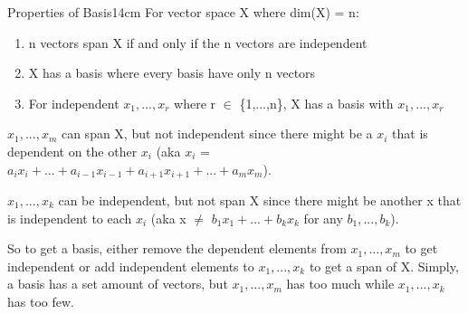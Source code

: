     \vspace{0.5cm}



    \begin{wtheorem}{Properties of Basis}{14cm}
        For vector space X where dim(X) = n:

        \begin{enumerate}[label=(\alph*), itemsep=0.1cm]
            \item n vectors span X if and only if the n vectors are independent

            \item X has a basis where every basis have only n vectors
            
            \item For independent $x_1,...,x_r$ where r $\in$ \{1,...,n\},
                X has a basis with $x_1,...,x_r$
        \end{enumerate}        
    \end{wtheorem}

    \begin{intuition}
        $x_1,...,x_m$ can span X, but not independent since there might
        be a $x_i$ that is dependent on the other $x_i$
        (aka $x_i$ = $a_ix_i + ... + a_{i-1}x_{i-1}
                    + a_{i+1}x_{i+1} + ... + a_mx_m$).
        
        $x_1,...,x_k$ can be independent, but not span X since there might
        be another x that is independent to each $x_i$
        (aka x $\not =$ $b_1x_1 + ... + b_kx_k$ for any $b_1,...,b_k$).
        
        So to get a basis, either remove the dependent elements from
        $x_1,...,x_m$ to get independent or add independent elements
        to $x_1,...,x_k$ to get a span of X.
        Simply, a basis has a set amount of vectors, but
        $x_1,...,x_m$ has too much while $x_1,...,x_k$ has too few.
    \end{intuition}

